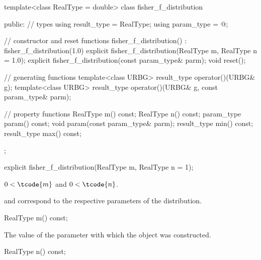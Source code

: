 %
%
\begin{codeblock}
template<class RealType = double>
  class fisher_f_distribution {
  public:
    // types
    using result_type = RealType;
    using param_type  = @\unspec@;

    // constructor and reset functions
    fisher_f_distribution() : fisher_f_distribution(1.0) {}
    explicit fisher_f_distribution(RealType m, RealType n = 1.0);
    explicit fisher_f_distribution(const param_type& parm);
    void reset();

    // generating functions
    template<class URBG>
      result_type operator()(URBG& g);
    template<class URBG>
      result_type operator()(URBG& g, const param_type& parm);

    // property functions
    RealType m() const;
    RealType n() const;
    param_type param() const;
    void param(const param_type& parm);
    result_type min() const;
    result_type max() const;
  };
\end{codeblock}

\begin{indexed}{}
\begin{itemdecl}
explicit fisher_f_distribution(RealType m, RealType n = 1);
\end{itemdecl}
\end{indexed}

\begin{itemdescr}
\pnum
\expects
$0 < \tcode{m}$ and $0 < \tcode{n}$.

\pnum
\remarks
{} and 
correspond to the respective parameters of the distribution.
\end{itemdescr}

\begin{indexed}{}
\begin{itemdecl}
RealType m() const;
\end{itemdecl}
\end{indexed}

\begin{itemdescr}
\pnum
\returns
The value of the  parameter
 with which the object was constructed.
\end{itemdescr}

\begin{indexed}{}
\begin{itemdecl}
RealType n() const;
\end{itemdecl}
\end{indexed}

